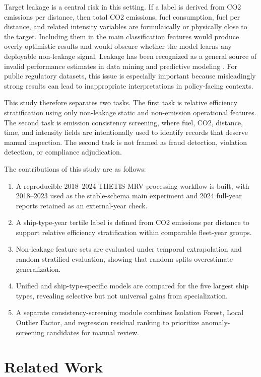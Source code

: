 \documentclass[jmse,article,submit,pdftex,oneauthor]{Definitions/mdpi}
\begin{document}
Target leakage is a central risk in this setting. If a label is derived from CO2 emissions per distance, then total CO2 emissions, fuel consumption, fuel per distance, and related intensity variables are formulaically or physically close to the target. Including them in the main classification features would produce overly optimistic results and would obscure whether the model learns any deployable non-leakage signal. Leakage has been recognized as a general source of invalid performance estimates in data mining and predictive modeling \cite{kaufman2012leakage}. For public regulatory datasets, this issue is especially important because misleadingly strong results can lead to inappropriate interpretations in policy-facing contexts.

This study therefore separates two tasks. The first task is relative efficiency stratification using only non-leakage static and non-emission operational features. The second task is emission consistency screening, where fuel, CO2, distance, time, and intensity fields are intentionally used to identify records that deserve manual inspection. The second task is not framed as fraud detection, violation detection, or compliance adjudication.

The contributions of this study are as follows:
\begin{enumerate}
\item A reproducible 2018--2024 THETIS-MRV processing workflow is built, with 2018--2023 used as the stable-schema main experiment and 2024 full-year reports retained as an external-year check.
\item A ship-type-year tertile label is defined from CO2 emissions per distance to support relative efficiency stratification within comparable fleet-year groups.
\item Non-leakage feature sets are evaluated under temporal extrapolation and random stratified evaluation, showing that random splits overestimate generalization.
\item Unified and ship-type-specific models are compared for the five largest ship types, revealing selective but not universal gains from specialization.
\item A separate consistency-screening module combines Isolation Forest, Local Outlier Factor, and regression residual ranking to prioritize anomaly-screening candidates for manual review.
\end{enumerate}

\section{Related Work}
\end{document}
